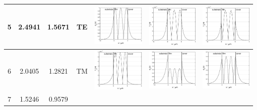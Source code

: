 \documentclass{assignment}
\begin{document}
\begin{sol}
\begin{itemize}
\begin{longtable}[c]{|c|c|c|c|c|c|c|}
    5 &
      2.4941 &
      1.5671 &
      TE &
      \includegraphics[width=.22\columnwidth]{Assignment-1-Problem-1-WaveGuide-1-ModalAnalysis-Mode-5-Ey.eps} &
      \includegraphics[width=.22\columnwidth]{Assignment-1-Problem-1-WaveGuide-1-ModalAnalysis-Mode-5-Hx.eps} &
      \includegraphics[width=.22\columnwidth]{Assignment-1-Problem-1-WaveGuide-1-ModalAnalysis-Mode-5-Hz.eps} \\ \hline
    6 &
      2.0405 &
      1.2821 &
      TM &
      \includegraphics[width=.22\columnwidth]{Assignment-1-Problem-1-WaveGuide-1-ModalAnalysis-Mode-6-Hy.eps} &
      \includegraphics[width=.22\columnwidth]{Assignment-1-Problem-1-WaveGuide-1-ModalAnalysis-Mode-6-Ex.eps} &
      \includegraphics[width=.22\columnwidth]{Assignment-1-Problem-1-WaveGuide-1-ModalAnalysis-Mode-6-Ez.eps} \\ \hline
    7 &
      1.5246 &
      0.9579 &

\end{longtable}
\end{itemize}
\end{sol}
\end{document}

